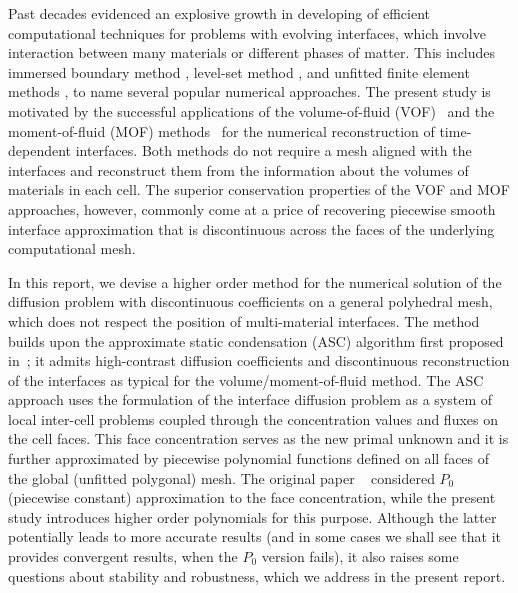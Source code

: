 \documentclass[12pt]{article}
\begin{document}
	Past decades evidenced an 	explosive growth in developing of efficient computational techniques for problems with evolving interfaces, which involve interaction between many materials or different phases of matter. This includes immersed boundary method \cite{peskin2002immersed}, level-set method \cite{sethian1999level}, and unfitted finite element methods \cite{belytschko2009review,burman2015cutfem}, to name several popular numerical approaches.
	The present study is motivated by the successful applications of the volume-of-fluid (VOF)~\cite{hirt1981volume} and the moment-of-fluid (MOF) methods~\cite{ahn2009adaptive} for the numerical  reconstruction of time-dependent interfaces. Both  methods do not require a mesh aligned with the  interfaces and reconstruct them from the information about the volumes of materials in each cell.
	The superior conservation properties of the  VOF and MOF approaches, however, commonly come at a price of recovering piecewise smooth interface approximation that is  discontinuous across the faces of the underlying computational mesh.
	
	In this report, we devise  a higher order method for the numerical solution of the diffusion problem with discontinuous  coefficients on a general polyhedral mesh, which does not respect the position of multi-material interfaces.  The method builds upon the approximate static condensation (ASC) algorithm first proposed in~\cite{kikinzon2017approximate}; it admits high-contrast diffusion coefficients and discontinuous reconstruction of the interfaces as typical for the volume/moment-of-fluid method. The ASC approach uses the formulation of the interface diffusion problem as a system of local inter-cell problems  coupled through the concentration values and fluxes on the cell faces. This face concentration serves as the new primal unknown and it is further approximated by piecewise  polynomial functions defined on all faces of the global (unfitted polygonal) mesh. The original paper ~\cite{kikinzon2017approximate} considered $P_0$ (piecewise constant) approximation to the face concentration, while the present study introduces higher order polynomials for this purpose.
	Although the latter potentially leads to more accurate results  (and in some cases we shall see that it provides convergent results, when the $P_0$ version fails), it also raises some questions about stability and robustness, which we address in the present report.
	
\end{document}
